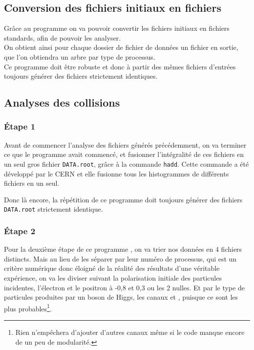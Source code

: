 

\subsection{Conversion des fichiers initiaux en fichiers \ROOT}

Grâce au programme \processor on va pouvoir convertir les fichiers initiaux \SLCIO en fichiers \ROOT standards, afin de pouvoir les analyser.\\

On obtient ainsi pour chaque dossier de fichier de données \SLCIO un fichier \ROOT en sortie, \cad que l'on obtiendra un arbre \ROOT par type de processus.\\

Ce programme doit être robuste et donc à partir des mêmes fichiers d'entrées toujours générer des fichiers \ROOT strictement identiques.

\subsection{Analyses des collisions}

\subsubsection{Étape 1}

Avant de commencer l'analyse des fichiers \ROOT générés précédemment, on va terminer ce que le programme \processor avait commencé, et fusionner l'intégralité de ces fichiers en un seul gros fichier \texttt{DATA.root}, grâce à la commande \texttt{hadd}. 
Cette commande a été développé par le CERN et elle fusionne tous les histogrammes de différents fichiers en un seul\cite{root:hadd}. 

Donc là encore, la répétition de ce programme doit toujours générer des fichiers \texttt{DATA.root} strictement identique.

\subsubsection{Étape 2}

Pour la deuxième étape de ce programme \analysis, on va trier nos données en 4 fichiers distincts. 
Mais au lieu de les séparer par leur numéro de processus, qui est un critère numérique donc éloigné de la réalité des résultats d'une véritable expérience, on va les diviser suivant la polarisation initiale des particules incidentes, \cad l'électron et le positron à -0,8 et 0,3 ou les 2 nulles. 
Et par le type de particules produites par un boson de Higgs, \cad les canaux \bb et \WW, puisque ce sont les plus probables\footnote{Rien n'empêchera d'ajouter d'autres canaux même si le code manque encore de un peu de modularité.}.

